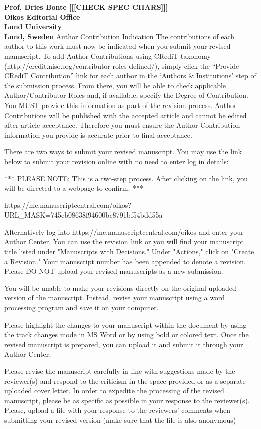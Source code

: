 \documentclass[12pt]{letter}
\begin{document}
\begin{letter}{\bf Prof. Dries Bonte [[[CHECK SPEC CHARS]]]\\
Oikos Editorial Office \\
Lund University \\
Lund, Sweden}
Author Contribution Indication
The contributions of each author to this work must now be indicated when you submit your revised manuscript. To add Author Contributions using CRediT taxonomy (http://credit.niso.org/contributor-roles-defined/), simply click the “Provide CRediT Contribution” link for each author in the ‘Authors & Institutions’ step of the submission process. From there, you will be able to check applicable Author/Contributor Roles and, if available, specify the Degree of Contribution. You MUST provide this information as part of the revision process. Author Contributions will be published with the accepted article and cannot be edited after article acceptance. Therefore you must ensure the Author Contribution information you provide is accurate prior to final acceptance.

There are two ways to submit your revised manuscript. You may use the link below to submit your revision online with no need to enter log in details:

*** PLEASE NOTE: This is a two-step process. After clicking on the link, you will be directed to a webpage to confirm. ***

https://mc.manuscriptcentral.com/oikos?URL_MASK=745eb08638f94600bc8791bf54bdd55a

Alternatively log into https://mc.manuscriptcentral.com/oikos and enter your Author Center. You can use the revision link or you will find your manuscript title listed under "Manuscripts with Decisions."  Under "Actions," click on "Create a Revision."  Your manuscript number has been appended to denote a revision.  Please DO NOT upload your revised manuscripts as a new submission.

You will be unable to make your revisions directly on the original uploaded version of the manuscript.  Instead, revise your manuscript using a word processing program and save it on your computer.

Please highlight the changes to your manuscript within the document by using the track changes mode in MS Word or by using bold or colored text. Once the revised manuscript is prepared, you can upload it and submit it through your Author Center.

Please revise the manuscript carefully in line with suggestions made by the reviewer(s) and respond to the criticism in the space provided or as a separate uploaded cover letter.  In order to expedite the processing of the revised manuscript, please be as specific as possible in your response to the reviewer(s). Please, upload a file with your response to the reviewers' comments when submitting your revised version (make sure that the file is also anonymous)


\end{letter}
\end{document}
